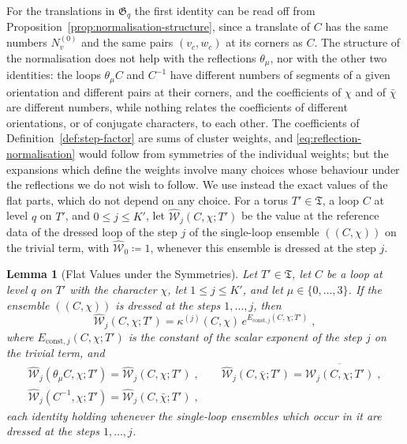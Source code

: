 \documentclass[11pt]{preprint}
\numberwithin{equation}{section}
\newtheorem{lemma}[theorem]{Lemma}
\theoremstyle{definition}
\theoremstyle{remark}
\theoremstyle{plain}
\begin{document}
For the translations in $\mathfrak G_q$ the first identity can be read off from Proposition~\ref{prop:normalisation-structure}, since a translate of $C$ has the same numbers $N^{(0)}_v$ and the same pairs $(v_c, w_c)$ at its corners as $C$. The structure of the normalisation does not help with the reflections $\theta_\mu$, nor with the other two identities: the loops $\theta_\mu C$ and $C^{-1}$ have different numbers of segments of a given orientation and different pairs at their corners, and the coefficients of $\chi$ and of $\bar\chi$ are different numbers, while nothing relates the coefficients of different orientations, or of conjugate characters, to each other. The coefficients of Definition~\ref{def:step-factor} are sums of cluster weights, and \eqref{eq:reflection-normalisation} would follow from symmetries of the individual weights; but the expansions which define the weights involve many choices whose behaviour under the reflections we do not wish to follow. We use instead the exact values of the flat parts, which do not depend on any choice. For a torus $T' \in \mathfrak T$, a loop $C$ at level $q$ on $T'$, and $0 \leq j \leq K'$, let $\widehat{\mathcal W}_j(C, \chi; T')$ be the value at the reference data of the dressed loop of the step $j$ of the single-loop ensemble $((C, \chi))$ on the trivial term, with $\widehat{\mathcal W}_0 \coloneqq 1$, whenever this ensemble is dressed at the step $j$.

\begin{lemma}[Flat Values under the Symmetries]\label{lem:flat-values}
Let $T' \in \mathfrak T$, let $C$ be a loop at level $q$ on $T'$ with the character $\chi$, let $1 \leq j \leq K'$, and let $\mu \in \{ 0, \dots, 3 \}$. If the ensemble $((C, \chi))$ is dressed at the steps $1, \dots, j$, then
\begin{equation}\label{eq:flat-value}
    \widehat{\mathcal W}_j(C, \chi; T') = \kappa^{(j)}(C, \chi)\,e^{E_{\mathrm{const},j}(C, \chi; T')}\;,
\end{equation}
where $E_{\mathrm{const},j}(C, \chi; T')$ is the constant of the scalar exponent of the step $j$ on the trivial term, and
\begin{equation}\label{eq:flat-value-symmetries}
    \begin{gathered}
        \widehat{\mathcal W}_j(\theta_\mu C, \chi; T') = \widehat{\mathcal W}_j(C, \chi; T')\;,
        \qquad
        \widehat{\mathcal W}_j(C, \bar\chi; T') = \overline{\widehat{\mathcal W}_j(C, \chi; T')}\;,
        \\
        \widehat{\mathcal W}_j(C^{-1}, \chi; T') = \widehat{\mathcal W}_j(C, \bar\chi; T')\;,
    \end{gathered}
\end{equation}
each identity holding whenever the single-loop ensembles which occur in it are dressed at the steps $1, \dots, j$.
\end{lemma}
\end{document}
